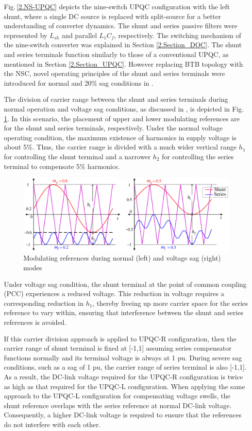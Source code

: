 Fig.\,\ref{2.NS-UPQC} depicts the nine-switch UPQC configuration with the left shunt, where a single DC source is replaced with split-source for a better understanding of converter dynamics. The shunt and series passive filters were represented by $L_{sh}$ and parallel $L_{1} C_{f}$, respectively. The switching mechanism of the nine-switch converter was explained in Section \ref{2.Section_DOC}. The shunt and series terminals function similarly to those of a conventional UPQC, as mentioned in Section \ref{2.Section_UPQC}. However replacing BTB topology with the NSC, novel operating principles of the shunt and series terminals were introduced for normal and 20\% sag conditions in \cite{5713844}.

The division of carrier range between the shunt and series terminals during normal operation and voltage sag conditions, as discussed in \cite{5713844}, is depicted in Fig.\,\ref{2.carrier}. In this scenario, the placement of upper and lower modulating references are for the shunt and series terminals, respectively. Under the normal voltage operating condition, the maximum existence of harmonics in supply voltage is about 5\%. Thus, the carrier range is divided with a much wider vertical range $h_1$ for controlling the shunt terminal and a narrower $h_2$ for controlling the series terminal to compensate 5\% harmonics.   
\begin{figure}[ht]
	\centering	
	\includegraphics[scale=0.7]{figures/Chapter_1_2/fig3}
	\caption{Modulating references during normal (left) and voltage sag (right) modes}
	\label{2.carrier}
\end{figure}

Under voltage sag condition, the shunt terminal at the point of common coupling (PCC) experiences a reduced voltage. This reduction in voltage requires a corresponding reduction in $h_1$, thereby freeing up more carrier space for the series reference to vary within, ensuring that interference between the shunt and series references is avoided. 

If this carrier division approach is applied to UPQC-R configuration, then the carrier range of shunt terminal is fixed at [-1,1] assuming series compensator functions normally and its terminal voltage is always at 1 pu. During severe sag conditions, such as a sag of 1 pu, the carrier range of series terminal is also [-1,1]. As a result, the DC-link voltage required for the UPQC-R configuration is twice as high as that required for the UPQC-L configuration. When applying the same approach to the UPQC-L configuration for compensating voltage swells, the shunt reference overlaps with the series reference at normal DC-link voltage. Consequently, a higher DC-link voltage is required to ensure that the references do not interfere with each other. 

